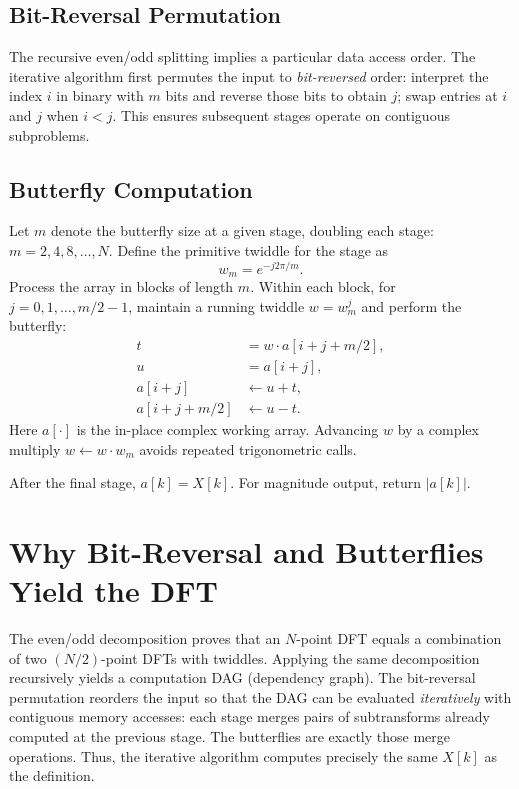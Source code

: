 \documentclass[11pt,a4paper]{article}
\begin{document}
\subsection{Bit-Reversal Permutation}
The recursive even/odd splitting implies a particular data access order. The iterative algorithm first permutes the input to \emph{bit-reversed} order: interpret the index $i$ in binary with $m$ bits and reverse those bits to obtain $j$; swap entries at $i$ and $j$ when $i<j$. This ensures subsequent stages operate on contiguous subproblems.

\subsection{Butterfly Computation}
Let $m$ denote the butterfly size at a given stage, doubling each stage: $m=2,4,8,\dots,N$. Define the primitive twiddle for the stage as
\begin{equation}
  w_m = e^{-j 2\pi/m}.
\end{equation}
Process the array in blocks of length $m$. Within each block, for $j=0,1,\dots, m/2-1$, maintain a running twiddle $w = w_m^j$ and perform the butterfly:
\begin{align}
  t &= w \cdot a[i + j + m/2], \\
  u &= a[i + j], \\
  a[i + j] &\leftarrow u + t, \\
  a[i + j + m/2] &\leftarrow u - t.
\end{align}
Here $a[\cdot]$ is the in-place complex working array. Advancing $w$ by a complex multiply $w \leftarrow w \cdot w_m$ avoids repeated trigonometric calls.

After the final stage, $a[k] = X[k]$. For magnitude output, return $|a[k]|$.

\section{Why Bit-Reversal and Butterflies Yield the DFT}
The even/odd decomposition proves that an $N$-point DFT equals a combination of two $(N/2)$-point DFTs with twiddles. Applying the same decomposition recursively yields a computation DAG (dependency graph). The bit-reversal permutation reorders the input so that the DAG can be evaluated \emph{iteratively} with contiguous memory accesses: each stage merges pairs of subtransforms already computed at the previous stage. The butterflies are exactly those merge operations. Thus, the iterative algorithm computes precisely the same $X[k]$ as the definition.
\end{document}
